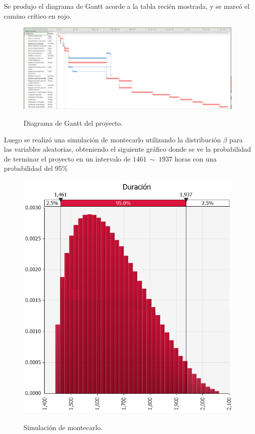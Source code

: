 

Se produjo el diagrama de Gantt acorde a la tabla recién mostrada, y se marcó el camino crítico en rojo.
\begin{figure}[H]
	\centering
	\includegraphics[width=1\linewidth]{ImagenesFactibilidad/project}
	\label{fig:gantt}
	\caption{Diagrama de Gantt del proyecto.}
\end{figure}

Luego se realizó una simulación de montecarlo utilizando la distribución $\beta$ para las variables aleatorias, obteniendo el siguiente gráfico donde se ve la probabilidad de terminar el proyecto en un intervalo de $1461 \ \sim \ 1937 $ horas con una probabilidad del 95$\%$
\begin{figure}[H]
	\centering
	\includegraphics[width=0.5\linewidth]{ImagenesFactibilidad/montecarlo}
	\label{fig:montecarlo_tiempos}
	\caption{Simulación de montecarlo.}
\end{figure}

